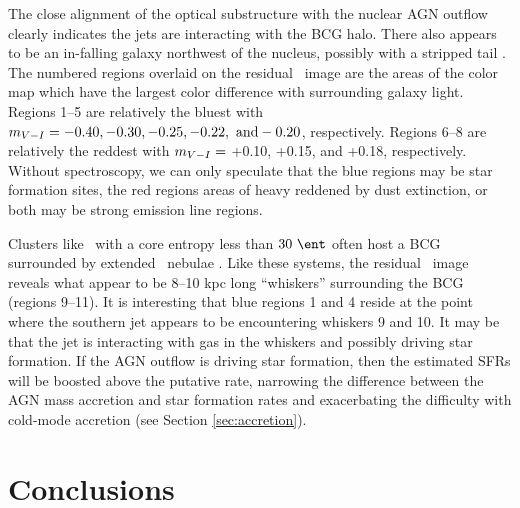 \documentclass[iop]{emulateapj-rtx4}
\begin{document}
The close alignment of the optical substructure with the nuclear AGN
outflow clearly indicates the jets are interacting with the BCG
halo. There also appears to be an in-falling galaxy northwest of the
nucleus, possibly with a stripped tail \citep[see][for
  example]{2007ApJ...671..190S}. The numbered regions overlaid on the
residual \myv\ image are the areas of the color map which have the
largest color difference with surrounding galaxy light. Regions 1--5
are relatively the bluest with $m_{V-I} = -0.40, -0.30, -0.25,
-0.22, ~\rm{and} -0.20$, respectively. Regions 6--8 are relatively the
reddest with $m_{V-I} =$ +0.10, +0.15, and +0.18,
respectively. Without spectroscopy, we can only speculate that the
blue regions may be star formation sites, the red regions areas of
heavy reddened by dust extinction, or both may be strong emission line
regions.

Clusters like \rbs\ with a core entropy less than $30 ~\ent$ often
host a BCG surrounded by extended \halpha\ nebulae
\citep[\eg][]{mcdonald10}. Like these systems, the residual
\myi\ image reveals what appear to be 8--10 kpc long ``whiskers''
surrounding the BCG (regions 9--11). It is interesting that blue
regions 1 and 4 reside at the point where the southern jet appears to
be encountering whiskers 9 and 10. It may be that the jet is
interacting with gas in the whiskers and possibly driving star
formation. If the AGN outflow is driving star formation, then the
estimated SFRs will be boosted above the putative rate, narrowing the
difference between the AGN mass accretion and star formation rates and
exacerbating the difficulty with cold-mode accretion (see Section
\ref{sec:accretion}).

\section{Conclusions}
\label{sec:con}
\end{document}
